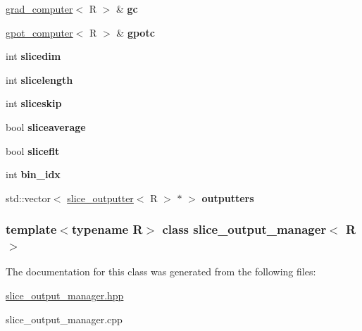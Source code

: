 \begin{DoxyCompactItemize}
\item 
\hypertarget{classslice__output__manager_aef9191da41665323b7b552c1cac39025}{
\hyperlink{classgrad__computer}{grad\_\-computer}$<$ R $>$ \& {\bfseries gc}}
\label{classslice__output__manager_aef9191da41665323b7b552c1cac39025}

\item 
\hypertarget{classslice__output__manager_a4c23fefda63c2c5cb29f73d73374913e}{
\hyperlink{classgpot__computer}{gpot\_\-computer}$<$ R $>$ \& {\bfseries gpotc}}
\label{classslice__output__manager_a4c23fefda63c2c5cb29f73d73374913e}

\item 
\hypertarget{classslice__output__manager_ab53afdf80adec6a9a06869a11a9c6394}{
int {\bfseries slicedim}}
\label{classslice__output__manager_ab53afdf80adec6a9a06869a11a9c6394}

\item 
\hypertarget{classslice__output__manager_ab16957b5fabbc0068c33ac4bf431085d}{
int {\bfseries slicelength}}
\label{classslice__output__manager_ab16957b5fabbc0068c33ac4bf431085d}

\item 
\hypertarget{classslice__output__manager_aa01a399598c39945b501b1ff9d2a0829}{
int {\bfseries sliceskip}}
\label{classslice__output__manager_aa01a399598c39945b501b1ff9d2a0829}

\item 
\hypertarget{classslice__output__manager_afdd5365b8dcbf9a1e948c476cd28ecc2}{
bool {\bfseries sliceaverage}}
\label{classslice__output__manager_afdd5365b8dcbf9a1e948c476cd28ecc2}

\item 
\hypertarget{classslice__output__manager_ad286ed8d06a07e2c98ae506718165162}{
bool {\bfseries sliceflt}}
\label{classslice__output__manager_ad286ed8d06a07e2c98ae506718165162}

\item 
\hypertarget{classslice__output__manager_a1fe93dc74b0853ed83416439e286d898}{
int {\bfseries bin\_\-idx}}
\label{classslice__output__manager_a1fe93dc74b0853ed83416439e286d898}

\item 
\hypertarget{classslice__output__manager_a3c7aaa9dec8709ad63c587816808d77b}{
std::vector$<$ \hyperlink{classslice__outputter}{slice\_\-outputter}$<$ R $>$ $\ast$ $>$ {\bfseries outputters}}
\label{classslice__output__manager_a3c7aaa9dec8709ad63c587816808d77b}

\end{DoxyCompactItemize}
\subsubsection*{template$<$typename R$>$ class slice\_\-output\_\-manager$<$ R $>$}



The documentation for this class was generated from the following files:\begin{DoxyCompactItemize}
\item 
\hyperlink{slice__output__manager_8hpp}{slice\_\-output\_\-manager.hpp}\item 
slice\_\-output\_\-manager.cpp\end{DoxyCompactItemize}
